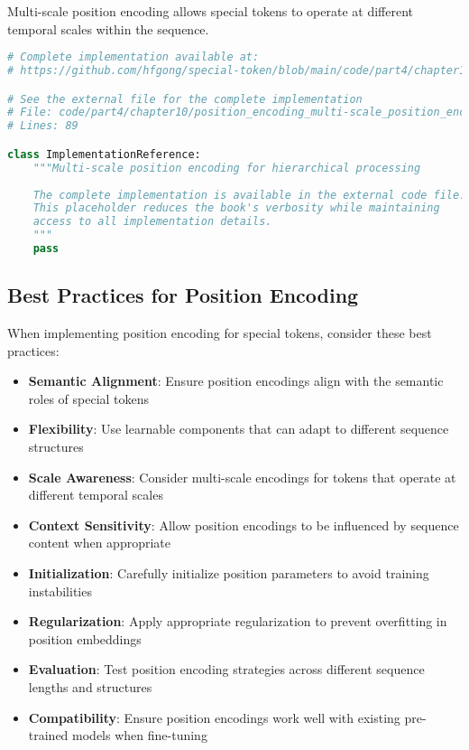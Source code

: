 Multi-scale position encoding allows special tokens to operate at different temporal scales within the sequence.

\begin{lstlisting}[language=Python, caption={Multi-scale position encoding for hierarchical processing}]
# Complete implementation available at:
# https://github.com/hfgong/special-token/blob/main/code/part4/chapter10/position_encoding_multi-scale_position_encoding_.py

# See the external file for the complete implementation
# File: code/part4/chapter10/position_encoding_multi-scale_position_encoding_.py
# Lines: 89

class ImplementationReference:
    """Multi-scale position encoding for hierarchical processing
    
    The complete implementation is available in the external code file.
    This placeholder reduces the book's verbosity while maintaining
    access to all implementation details.
    """
    pass
\end{lstlisting}

\subsection{Best Practices for Position Encoding}

When implementing position encoding for special tokens, consider these best practices:

\begin{itemize}
\item \textbf{Semantic Alignment}: Ensure position encodings align with the semantic roles of special tokens
\item \textbf{Flexibility}: Use learnable components that can adapt to different sequence structures
\item \textbf{Scale Awareness}: Consider multi-scale encodings for tokens that operate at different temporal scales
\item \textbf{Context Sensitivity}: Allow position encodings to be influenced by sequence content when appropriate
\item \textbf{Initialization}: Carefully initialize position parameters to avoid training instabilities
\item \textbf{Regularization}: Apply appropriate regularization to prevent overfitting in position embeddings
\item \textbf{Evaluation}: Test position encoding strategies across different sequence lengths and structures
\item \textbf{Compatibility}: Ensure position encodings work well with existing pre-trained models when fine-tuning
\end{itemize}